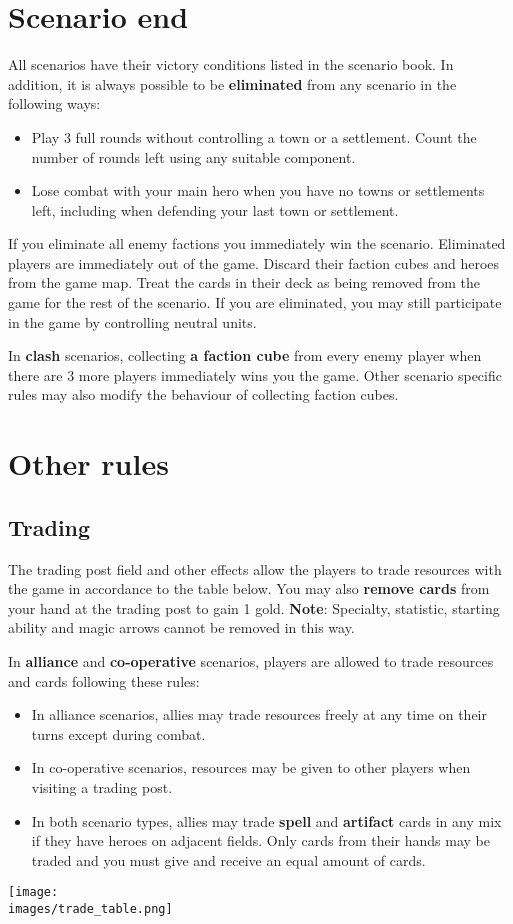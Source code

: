 \documentclass[12pt]{article}
\def\assets{assets}
\def\images{\assets/images}
\begin{document}
\section[Scenario end]{Scenario end\hypertarget{End}{}}
All scenarios have their victory conditions listed in the scenario book. In addition, it is always possible to be \textbf{eliminated} from any scenario in the following ways:
\begin{itemize}
    \item Play 3 full rounds without controlling a town or a settlement. Count the number of rounds left using any suitable component.
    \item Lose combat with your main hero when you have no towns or settlements left, including when defending your last town or settlement.
\end{itemize}
If you eliminate all enemy factions you immediately win the scenario. Eliminated players are immediately out of the game. Discard their faction cubes and heroes from the game map. Treat the cards in their deck as being removed from the game for the rest of the scenario. If you are eliminated, you may still participate in the game by controlling neutral units.\par
In \textbf{clash} scenarios, collecting \textbf{a faction cube} from every enemy player when there are 3 more players immediately wins you the game. Other scenario specific rules may also modify the behaviour of collecting faction cubes.
\clearpage

\section{Other rules}
\subsection*{\hypertarget{Trading}{Trading}}
The trading post field and other effects allow the players to trade resources with the game in accordance to the table below. You may also \textbf{remove cards} from your hand at the trading post to gain 1 gold. \textbf{Note}: Specialty, statistic, starting ability and magic arrows cannot be removed in this way.\par
In \textbf{alliance} and \textbf{co-operative} scenarios, players are allowed to trade resources and cards following these rules:
\begin{itemize}
    \item In alliance scenarios, allies may trade resources freely at any time on their turns except during combat.
    \item In co-operative scenarios, resources may be given to other players when visiting a trading post.
    \item In both scenario types, allies may trade \textbf{spell} and \textbf{artifact} cards in any mix if they have heroes on adjacent fields. Only cards from their hands may be traded and you must give and receive an equal amount of cards.
\end{itemize}
\begin{center}
\texttt{[image: \\images/trade\_table.png]}
\end{center}
\clearpage
\end{document}
